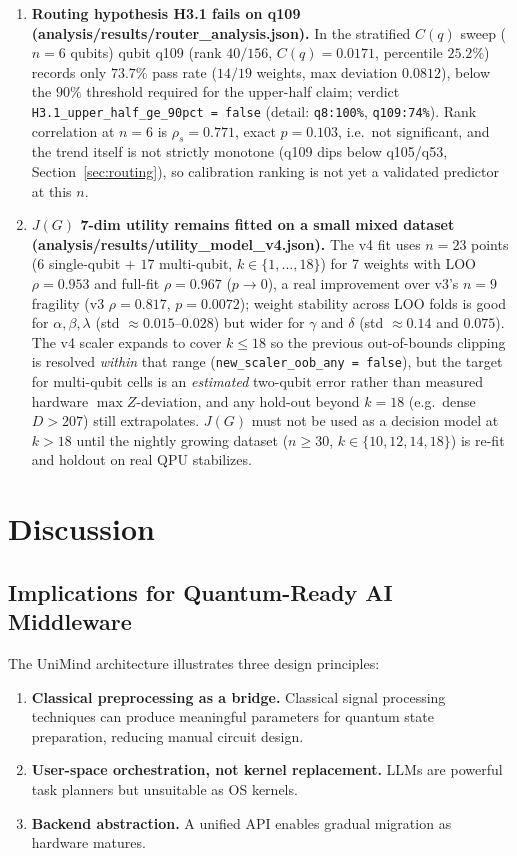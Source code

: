 ﻿\documentclass[12pt,a4paper]{article}
\begin{document}
\begin{enumerate}[leftmargin=2em]
    \item \textbf{Routing hypothesis H3.1 fails on q109 (analysis/results/router\_analysis.json).} In the stratified $C(q)$ sweep ($n{=}6$ qubits) qubit q109 (rank $40/156$, $C(q)=0.0171$, percentile $25.2\%$) records only $73.7\%$ pass rate ($14/19$ weights, max deviation $0.0812$), below the $90\%$ threshold required for the upper-half claim; verdict \texttt{H3.1\_upper\_half\_ge\_90pct = false} (detail: \texttt{q8:100\%}, \texttt{q109:74\%}). Rank correlation at $n{=}6$ is $\rho_s=0.771$, exact $p=0.103$, i.e.\ not significant, and the trend itself is not strictly monotone (q109 dips below q105/q53, Section~\ref{sec:routing}), so calibration ranking is not yet a validated predictor at this $n$.
    \item \textbf{$J(G)$ 7-dim utility remains fitted on a small mixed dataset (analysis/results/utility\_model\_v4.json).} The v4 fit uses $n{=}23$ points ($6$ single-qubit $+$ $17$ multi-qubit, $k\in\{1,\dots,18\}$) for 7 weights with LOO $\rho=0.953$ and full-fit $\rho=0.967$ ($p\to 0$), a real improvement over v3's $n{=}9$ fragility (v3 $\rho=0.817$, $p=0.0072$); weight stability across LOO folds is good for $\alpha,\beta,\lambda$ (std $\approx 0.015$--$0.028$) but wider for $\gamma$ and $\delta$ (std $\approx 0.14$ and $0.075$). The v4 scaler expands to cover $k\le 18$ so the previous out-of-bounds clipping is resolved \emph{within} that range (\texttt{new\_scaler\_oob\_any = false}), but the target for multi-qubit cells is an \emph{estimated} two-qubit error rather than measured hardware $\max Z$-deviation, and any hold-out beyond $k{=}18$ (e.g.\ dense $D{>}207$) still extrapolates. $J(G)$ must not be used as a decision model at $k{>}18$ until the nightly growing dataset ($n{\ge}30$, $k{\in}\{10,12,14,18\}$) is re-fit and holdout on real QPU stabilizes.
\end{enumerate}


\section{Discussion}\label{sec:discussion}

\subsection{Implications for Quantum-Ready AI Middleware}

The UniMind architecture illustrates three design principles:

\begin{enumerate}[leftmargin=2em]
    \item \textbf{Classical preprocessing as a bridge.} Classical signal processing techniques can produce meaningful parameters for quantum state preparation, reducing manual circuit design.
    \item \textbf{User-space orchestration, not kernel replacement.} LLMs are powerful task planners but unsuitable as OS kernels.
    \item \textbf{Backend abstraction.} A unified API enables gradual migration as hardware matures.
\end{enumerate}
\end{document}
